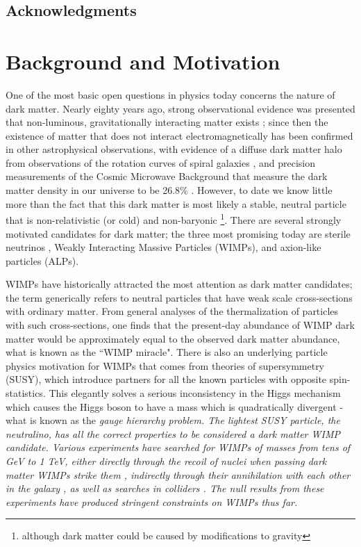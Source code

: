 \documentclass[12pt,twosides]{book}
\begin{document}
\tableofcontents
\section{Acknowledgments}

\chapter{Background and Motivation}


One of the most basic open questions in physics today concerns the nature of dark matter. Nearly eighty years ago, strong observational evidence was presented that non-luminous, gravitationally interacting matter exists \cite{zwicky37}; since then the existence of matter that does not interact electromagnetically has been confirmed in other astrophysical observations, with evidence of a diffuse dark matter halo from observations of the rotation curves of spiral galaxies \cite{rubin80}, and precision measurements of the Cosmic Microwave Background that measure the dark matter density in our universe to be 26.8$\%$ \cite{planck14}. However, to date we know little more than the fact that this dark matter is most likely a stable, neutral particle that is non-relativistic (or cold) and non-baryonic \footnote{although dark matter could be caused by modifications to gravity}. There are several strongly motivated candidates for dark matter; the three most promising today are sterile neutrinos \cite{kusenko09}, Weakly Interacting Massive Particles (WIMPs), and axion-like particles (ALPs). 

WIMPs have historically attracted the most attention as dark matter candidates; the term generically refers to neutral particles that have weak scale cross-sections with ordinary matter. From general analyses of the thermalization of particles with such cross-sections, one finds that the present-day abundance of WIMP dark matter would be approximately equal to the observed dark matter abundance, what is known as the ``WIMP miracle". There is also an underlying particle physics motivation for WIMPs that comes from theories of supersymmetry (SUSY), which introduce partners for all the known particles with opposite spin-statistics. This elegantly solves a serious inconsistency in the Higgs mechanism which causes the Higgs boson to have a mass which is quadratically divergent - what is known as the \it{gauge hierarchy problem}. The lightest SUSY particle, the neutralino, has all the correct properties to be considered a dark matter WIMP candidate. Various experiments have searched for WIMPs of masses from tens of GeV to 1 TeV, either directly through the recoil of nuclei when passing dark matter WIMPs strike them \cite{lux14}, indirectly through their annihilation with each other in the galaxy \cite{slatyer09}, as well as searches in colliders \cite{rajaraman11}. The null results from these experiments have produced stringent constraints on WIMPs thus far. 
\end{document}
